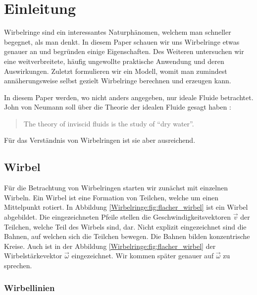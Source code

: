 %
%
%
\section{Einleitung}
%
Wirbelringe sind ein interessantes Naturphänomen, welchem man schneller begegnet, als man denkt. 
%
In diesem Paper schauen wir uns Wirbelringe etwas genauer an und begründen einige Eigenschaften. 
Des Weiteren untersuchen wir eine weitverbreitete, häufig ungewollte praktische Anwendung und deren Auswirkungen. 
Zuletzt formulieren wir ein Modell, womit man zumindest annäherungsweise selbst gezielt Wirbelringe berechnen und erzeugen kann.

In diesem Paper werden, wo nicht anders angegeben, nur ideale Fluide betrachtet.
John von Neumann soll über die Theorie der idealen Fluide gesagt haben \cite{Wirbelringe:feynman1964lectures}: 
%
\begin{quote}
    The theory of inviscid fluids is the study of ``dry water''.
\end{quote}
Für das Verständnis von Wirbelringen ist sie aber ausreichend.

\subsection{Wirbel}



Für die Betrachtung von Wirbelringen starten wir zunächst mit einzelnen Wirbeln.
Ein Wirbel ist eine Formation von Teilchen, welche um einen Mittelpunkt rotiert.
In Abbildung \ref{Wirbelringe:fig:flacher_wirbel} ist ein Wirbel abgebildet.
Die eingezeichneten Pfeile stellen die Geschwindigkeitsvektoren \( \vec{v} \) der Teilchen, welche Teil des Wirbels sind, dar.
Nicht explizit eingezeichnet sind die Bahnen, auf welchen sich die Teilchen bewegen.
Die Bahnen bilden konzentrische Kreise.
Auch ist in der Abbildung \ref{Wirbelringe:fig:flacher_wirbel} der Wirbelstärkevektor \(\vec{\omega}\) eingezeichnet.
%
Wir kommen später genauer auf \(\vec{\omega}\) zu sprechen.

\subsubsection*{Wirbellinien\label{Wirbelringe:Wirbellinien}}

